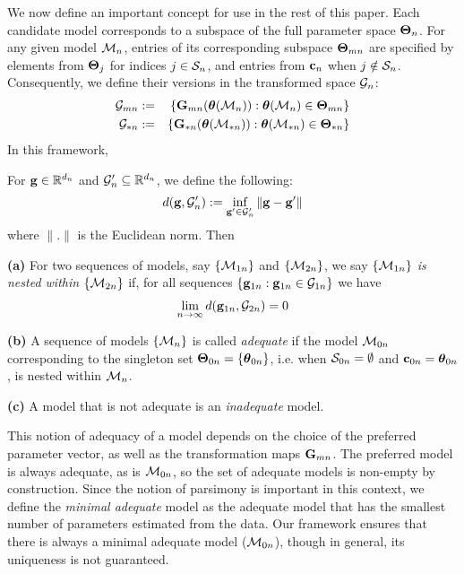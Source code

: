 %
% 

We now define an important concept for use in the rest of this paper. Each candidate model corresponds to a subspace of the full parameter space ${\boldsymbol{\Theta}}_{n}$. For any given model ${\cal{M}}_n$, entries of its corresponding subspace ${\boldsymbol{\Theta}}_{m n}$ are specified by elements from ${\boldsymbol{\Theta}}_j$ for indices $j \in {\cal{S}}_n$, and entries from ${\bf{c}}_n$ when $j \notin {\cal{S}}_n$. Consequently, we define their versions in the transformed space ${\bf{\cal{G}}}_n$:
%
\begin{eqnarray*}
{\bf{\cal{G}}}_{m n} &:=& \{ {\mathbf{G}}_{mn} ({\boldsymbol{\theta}} ({\cal{M}}_n)): {\boldsymbol{\theta}} ({\cal{M}}_n) \in {\boldsymbol{\Theta}}_{m n} \}\\
{\bf{\cal{G}}}_{*n} &:=& \{ {\mathbf{G}}_{*n} ({\boldsymbol{\theta}} ({\cal{M}}_{*n})): {\boldsymbol{\theta}} ({\cal{M}}_{*n}) \in {\boldsymbol{\Theta}}_{*n} \}
\end{eqnarray*}
%
In this framework,
%
\begin{Definition}
For ${\bf{g}} \in {\mathbb{R}}^{d_n}$ and ${\cal{G}}_n' \subseteq {\mathbb{R}}^{d_n}$, we define the following:
%
$$ d( {\bf{g}}, {\cal{G}}_n') := \inf_{ {\bf{g}}' \in {\cal{G}}_n'} \| {\bf{g}} - {\bf{g}}' \| $$
%
where $\|.\|$ is the Euclidean norm. Then

\noindent\textbf{(a)} For two sequences of models, say $\{ {\cal{M}}_{1n} \}$ and $\{ {\cal{M}}_{2n} \}$, we say \textit{$\{ {\cal{M}}_{1n} \}$ is nested within $\{ {\cal{M}}_{2n} \}$} if, for all sequences $\{ {\bf{g}}_{1n} : {\bf{g}}_{1n} \in {\cal{G}}_{1n} \} $ we have
%
\begin{align}\label{eq:NestedModelDef}
\lim_{n \rightarrow \infty} d( {\bf{g}}_{1n}, {\cal{G}}_{2n} ) = 0
\end{align}
%

\noindent\textbf{(b)} A sequence of models $\{ {\cal{M}}_n \}$ is called {\it adequate} if the model ${\cal{M}}_{0 n}$ corresponding to the singleton set ${\boldsymbol{\Theta}}_{0 n} = \{ {\boldsymbol{\theta}}_{0 n} \}$, i.e. when ${\cal{S}}_{0 n} = \emptyset$ and ${\bf{c}}_{0 n} = {\boldsymbol{\theta}}_{0 n}$, is nested within ${\cal{M}}_n$.

\noindent\textbf{(c) }A model that is not adequate is an \textit{inadequate} model.
\end{Definition}
%

This notion of adequacy of a model depends on the choice of the preferred parameter vector, as well as the transformation maps ${\mathbf{G}}_{ m n}$. The preferred model is always adequate, as is ${\cal{M}}_{0 n}$, so the set of adequate models is non-empty by construction. Since the notion of parsimony is important in this context, we define the {\textit{minimal adequate}} model as the adequate model that has the smallest number of parameters estimated from the data. Our framework ensures that there is always a minimal adequate model (${\cal{M}}_{0 n}$), though in general, its uniqueness is not guaranteed.

